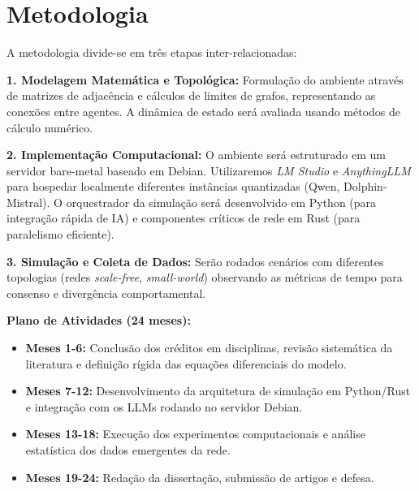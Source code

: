 \chapter{Metodologia}
A metodologia divide-se em três etapas inter-relacionadas:

\textbf{1. Modelagem Matemática e Topológica:} Formulação do ambiente através de matrizes de adjacência e cálculos de limites de grafos, representando as conexões entre agentes. A dinâmica de estado será avaliada usando métodos de cálculo numérico.

\textbf{2. Implementação Computacional:} O ambiente será estruturado em um servidor bare-metal baseado em Debian. Utilizaremos \textit{LM Studio} e \textit{AnythingLLM} para hospedar localmente diferentes instâncias quantizadas (Qwen, Dolphin-Mistral). O orquestrador da simulação será desenvolvido em Python (para integração rápida de IA) e componentes críticos de rede em Rust (para paralelismo eficiente).

\textbf{3. Simulação e Coleta de Dados:} Serão rodados cenários com diferentes topologias (redes \textit{scale-free}, \textit{small-world}) observando as métricas de tempo para consenso e divergência comportamental.

\textbf{Plano de Atividades (24 meses):}
\begin{itemize}
    \item \textbf{Meses 1-6:} Conclusão dos créditos em disciplinas, revisão sistemática da literatura e definição rígida das equações diferenciais do modelo.
    \item \textbf{Meses 7-12:} Desenvolvimento da arquitetura de simulação em Python/Rust e integração com os LLMs rodando no servidor Debian.
    \item \textbf{Meses 13-18:} Execução dos experimentos computacionais e análise estatística dos dados emergentes da rede.
    \item \textbf{Meses 19-24:} Redação da dissertação, submissão de artigos e defesa.
\end{itemize}
